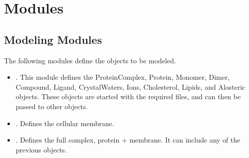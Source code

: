 \documentclass[letterpaper,10pt,english]{sphinxmanual}
\begin{document}
\section{Modules}
\label{\detokenize{installation:modules}}

\subsection{Modeling Modules}
\label{\detokenize{installation:modeling-modules}}
\sphinxAtStartPar
The following modules define the objects to be modeled.
\begin{itemize}
\item {} 
\sphinxAtStartPar
{}. This module defines the ProteinComplex, Protein,
Monomer, Dimer, Compound, Ligand, CrystalWaters, Ions, Cholesterol,
Lipids, and Alosteric objects. These objects are started with the
required files, and can then be passed to other objects.

\item {} 
\sphinxAtStartPar
{}. Defines the cellular membrane.

\item {} 
\sphinxAtStartPar
{}. Defines the full complex, protein + membrane.
It can include any of the previous objects.

\end{itemize}
\end{document}
